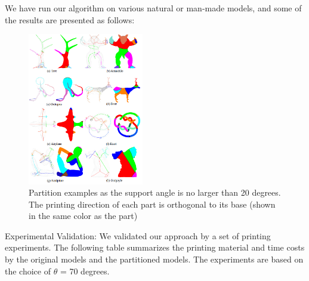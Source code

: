 We have run our algorithm on various natural or man-made models, and some of the results are presented as follows:

\begin{figure}[tbp]
  \centering
  \includegraphics[width=0.45\textwidth]{figs/programming.png}
  \caption{\label{fig:programming}%
           Partition examples as the support angle is no larger than 20 degrees. The printing direction of each part is orthogonal to its base (shown in the same color as the part)}
\end{figure}

Experimental Validation: We validated our approach by a set of printing experiments. The following table summarizes the printing material and time costs by the original models and the partitioned models. The experiments are based on the choice of $\theta$ = 70 degrees.




